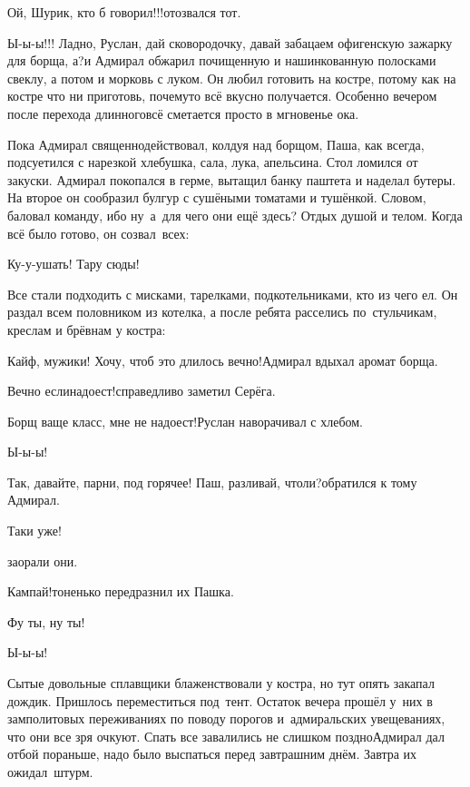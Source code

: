 \diagdash Ой, Шурик, кто б говорил!!!\mdash отозвался тот.

\diagdash Ы-ы-ы!!! Ладно, Руслан, дай сковородочку, давай забацаем офигенскую зажарку для борща, а?\mdash и Адмирал обжарил почищенную и нашинкованную полосками свеклу, а потом и морковь с луком. Он любил готовить на костре, потому как на костре что ни приготовь, почему\sdash то всё вкусно получается. Особенно вечером после перехода длинного\mdash всё сметается просто в мгновенье ока.

Пока Адмирал священнодействовал, колдуя над борщом, Паша, как всегда, подсуетился с нарезкой хлебушка, сала, лука, апельсина. Стол ломился от закуски. Адмирал покопался в герме, вытащил банку паштета и наделал бутеры. На второе он сообразил булгур с сушёными томатами и тушёнкой. Словом, баловал команду, ибо ну~а~для чего они ещё здесь? Отдых душой и телом. Когда всё было готово, он созвал~всех:

\diagdash Ку-у-ушать! Тару сюды!

Все стали подходить с мисками, тарелками, подкотельниками, кто из чего ел. Он раздал всем половником из котелка, а после ребята расселись по~стульчикам, креслам и брёвнам у костра:

\diagdash Кайф, мужики! Хочу, чтоб это длилось вечно!\mdash Адмирал вдыхал аромат борща.

\diagdash Вечно если\mdash надоест!\mdash справедливо заметил Серёга.

\diagdash Борщ ваще класс, мне не надоест!\mdash Руслан наворачивал с хлебом.

\diagdash Ы-ы-ы!

\diagdash Так, давайте, парни, под горячее! Паш, разливай, чтоли?\mdash обратился к тому Адмирал.

\diagdash Таки уже!

\mdash заорали они.

\diagdash Кампай!\mdash тоненько передразнил их Пашка.

\diagdash Фу ты, ну ты!

\diagdash Ы-ы-ы!

Сытые довольные сплавщики блаженствовали у костра, но тут опять закапал дождик. Пришлось переместиться под~тент.
Остаток вечера прошёл у~них в замполитовых переживаниях по поводу порогов и~адмиральских увещеваниях, что они все зря очкуют.
Спать все завалились не слишком поздно\mdash Адмирал дал отбой пораньше, надо было выспаться перед завтрашним днём. Завтра их ожидал~штурм.

\begin{center}
\end{center}
